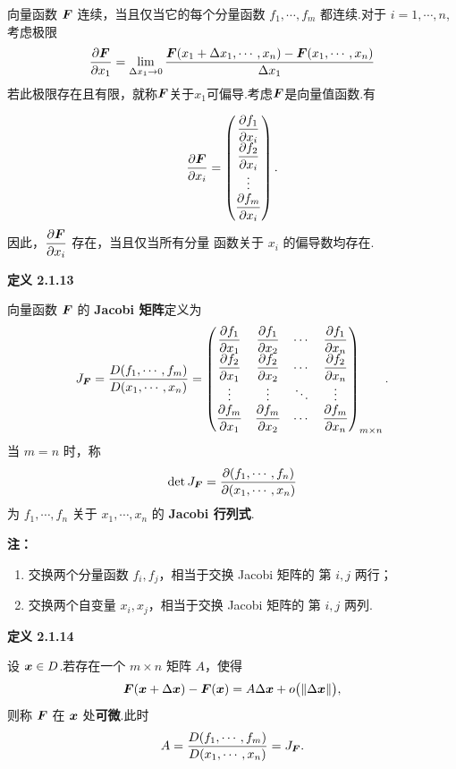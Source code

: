 向量函数 $\boldsymbol{F}$ 连续，当且仅当它的每个分量函数
$f_1,\cdots,f_m$ 都连续.对于 $i=1,\cdots,n$,考虑极限
\[\frac{\partial \boldsymbol{F}}{\partial x_1}=\lim\limits_{\Delta x_1\to 0 }\frac{\boldsymbol{F}(x_1+\Delta x_1,\cdots,x_n)-\boldsymbol{F}(x_1,\cdots,x_n)}{\Delta x_1}\]
若此极限存在且有限，就称$ \boldsymbol{F}$关于$x_1$可偏导.考虑$\boldsymbol{F} $是向量值函数.有

\[
\frac{\partial\boldsymbol{F}}{\partial x_i}
=
\begin{pmatrix}
\dfrac{\partial f_1}{\partial x_i}\\[4pt]
\dfrac{\partial f_2}{\partial x_i}\\
\vdots\\
\dfrac{\partial f_m}{\partial x_i}
\end{pmatrix}.
\]
因此，$\dfrac{\partial\boldsymbol{F}}{\partial x_i}$ 存在，当且仅当所有分量
函数关于 $x_i$ 的偏导数均存在.



\textbf{定义 2.1.13}

向量函数 $\boldsymbol{F}$ 的 \textbf{Jacobi 矩阵}定义为
	\[
	J_{\boldsymbol{F}}
	=
	\frac{D(f_1,\cdots,f_m)}
	{D(x_1,\cdots,x_n)}
	=
	\begin{pmatrix}
	\dfrac{\partial f_1}{\partial x_1}
	&\dfrac{\partial f_1}{\partial x_2}
	&\cdots
	&\dfrac{\partial f_1}{\partial x_n}\\[5pt]
	\dfrac{\partial f_2}{\partial x_1}
	&\dfrac{\partial f_2}{\partial x_2}
	&\cdots
	&\dfrac{\partial f_2}{\partial x_n}\\
	\vdots&\vdots&\ddots&\vdots\\
	\dfrac{\partial f_m}{\partial x_1}
	&\dfrac{\partial f_m}{\partial x_2}
	&\cdots
	&\dfrac{\partial f_m}{\partial x_n}
	\end{pmatrix}_{m\times n}.
	\]
	当 $m=n$ 时，称
	\[
	\det J_{\boldsymbol{F}}
	=
	\frac{\partial(f_1,\cdots,f_n)}
	{\partial(x_1,\cdots,x_n)}
	\]
	为 $f_1,\cdots,f_n$ 关于 $x_1,\cdots,x_n$ 的
	\textbf{Jacobi 行列式}.




\textbf{注：}
\begin{enumerate}
	\item 交换两个分量函数 $f_i,f_j$，相当于交换 Jacobi 矩阵的
	第 $i,j$ 两行；
	\item 交换两个自变量 $x_i,x_j$，相当于交换 Jacobi 矩阵的
	第 $i,j$ 两列.
\end{enumerate}



\textbf{定义 2.1.14}

设 $\boldsymbol{x}\in D$.若存在一个 $m\times n$ 矩阵 $A$，使得
	\[
	\boldsymbol{F}(\boldsymbol{x}+\Delta\boldsymbol{x})-\boldsymbol{F}(\boldsymbol{x})
	=
	A\Delta\boldsymbol{x}+o\bigl(\left\| \Delta\boldsymbol{x} \right\|\bigr),
	\]
	则称 $\boldsymbol{F}$ 在 $\boldsymbol{x}$ 处\textbf{可微}.此时
	\[
	A
	=
	\frac{D(f_1,\cdots,f_m)}
	{D(x_1,\cdots,x_n)}
	=
	J_{\boldsymbol{F}}.
	\]




